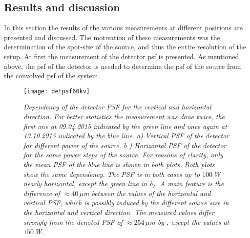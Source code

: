 \subsection{Results and discussion}\label{subsec:edgeresults}
In this section the results of the various measurements at different positions are presented and discussed. The motivation of these measurements was the determination of the spot-size of the source, and thus the entire resolution of the setup. At first the measurement of the detector \gls{psf} is presented. As mentioned above, the \gls{psf} of the detector is needed to determine the \gls{psf} of the source from the convolved \gls{psf} of the system.
\begin{figure}[t]
	\begin{center}
		\texttt{[image: detpsf60kv]}
	\end{center}
	\caption[Dependency of the detector PSF]{\textit{Dependency of the detector PSF for the vertical and horizontal direction. For better statistics the measurement was done twice, the first one at 09.04.2015 indicated by the green line and once again at 13.10.2015 indicated by the blue line. a) Vertical PSF of the detector for different power of the source. b ) Horizontal PSF of the detector for the same power steps of the source. For reasons of clarity, only the mean PSF of the blue line is shown in both plots. Both plots show the same dependency. The PSF is in both cases up to $100\,$W nearly horizontal, except the green line in b). A main feature is the difference of $\approx 40\, \mu$m between the values of the horizontal and vertical PSF, which is possibly induced by the different source size in the horizontal and vertical direction. The measured values differ strongly from the denoted PSF of $\approx 254\, \mu$m by \citep{Paxscan}, except the values at $150\,$W.}}
	\label{detpsf60}
\end{figure}
